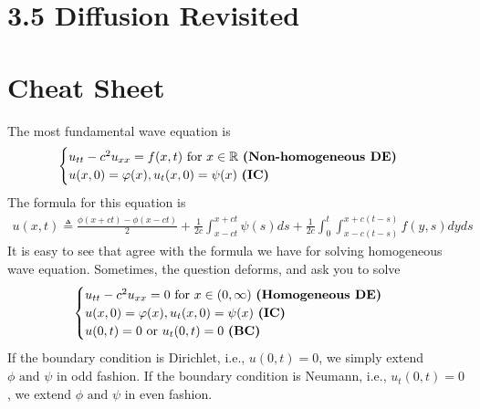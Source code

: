 \documentclass{report}
\begin{document}
\section{3.5 Diffusion Revisited}
\section{Cheat Sheet}
\begin{mdframed}
The most fundamental wave equation is 
\begin{align*}
\begin{cases}
  u_{tt}-c^2u_{xx}=f(x,t)\text{ for }x\inr\text{ \textbf{(Non-homogeneous DE)} } \\
  u(x,0)=\phi (x),u_t(x,0)=\psi (x)\text{ \textbf{(IC)} }
\end{cases}
\end{align*}
The formula for this equation is 
\begin{align}
\label{wavee}
u(x,t)\triangleq \frac{\phi (x+ct)-\phi (x-ct)}{2}+ \frac{1}{2c}\int^{x+ct}_{x-ct}\psi (s)ds+ \frac{1}{2c}\int_0^t \int^{x+c(t-s)}_{x-c(t-s)}f(y,s)dyds
\end{align}
It is easy to see that  agree with the formula we have for solving homogeneous wave equation. Sometimes, the question deforms, and ask you to solve  
\begin{align*}
\begin{cases}
  u_{tt}-c^2u_{xx}=0\text{ for }x\in (0,\infty)\text{ \textbf{(Homogeneous DE)} }\\
  u(x,0)=\phi (x),u_t(x,0)=\psi (x)\text{  \textbf{(IC)} }\\
  u(0,t)=0\text{ or }u_t(0,t)=0\text{ \textbf{(BC)} }
\end{cases}
\end{align*}
If the boundary condition is Dirichlet, i.e., $u(0,t)=0$, we simply extend $\phi\text{ and }\psi$ in odd fashion. If the boundary condition is Neumann, i.e., $u_t(0,t)=0$, we extend $\phi\text{ and }\psi$ in even fashion. 
\end{mdframed}
\end{document}
